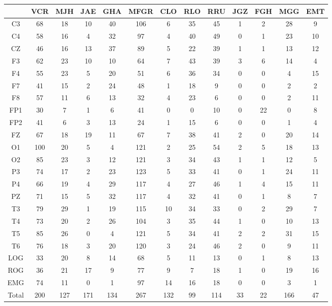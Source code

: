 \begin{SidewaysFigure}
\centering
\begin{tabular}{c|ccccc|cccc|ccc}
& VCR & MJH & JAE & GHA & MFGR
& CLO & RLO & RRU & JGZ
& FGH & MGG & EMT \\
\hline
C3&68&18&10&40&106&6&35&45&1&2&28&9 \\
C4&58&16&4&32&97&4&40&49&0&1&23&10 \\
CZ&46&16&13&37&89&5&22&39&1&1&13&12 \\
F3&62&23&10&10&64&7&43&39&3&6&14&4 \\
F4&55&23&5&20&51&6&36&34&0&0&4&15 \\
F7&41&15&2&24&48&1&18&9&0&0&2&2 \\
F8&57&11&6&13&32&4&23&6&0&0&2&11 \\
FP1&30&7&1&6&41&0&0&10&0&22&0&8 \\
FP2&41&6&3&13&24&1&15&6&0&0&1&4 \\
FZ&67&18&19&11&67&7&38&41&2&0&20&14 \\
O1&100&20&5&4&121&2&25&54&2&5&18&13 \\
O2&85&23&3&12&121&3&34&43&1&1&12&5 \\
P3&74&17&2&23&123&5&33&41&0&1&24&11 \\
P4&66&19&4&29&117&4&27&46&1&4&15&11 \\
PZ&71&15&5&32&117&4&32&41&0&1&8&7 \\
T3&79&29&1&19&115&10&34&33&0&2&29&7 \\
T4&73&20&2&26&104&3&35&44&1&0&10&13 \\
T5&85&26&0&4&121&5&34&41&2&2&31&15 \\
T6&76&18&3&20&120&3&24&46&2&0&9&11 \\
LOG&33&20&8&14&68&5&11&13&0&1&8&13 \\
ROG&36&21&17&9&77&9&7&18&1&0&19&16 \\
EMG&74&11&0&1&97&14&16&18&0&0&3&1 \\
\hline
Total&200&127&171&134&267&132&99&114&33&22&166&47
\end{tabular}
\caption{Total de \'epocas PE clasificadas como sue\~no MOR 
(fase R) para cada
canal. %
}
\label{total_gpos_mor}
\end{SidewaysFigure}

